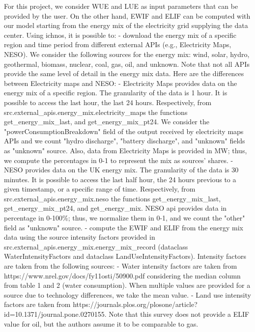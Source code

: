 For this project, we consider WUE and LUE as input parameters that can be provided by the user. On the other hand, EWIF and ELIF can be computed with our model starting from the energy mix of the electricity grid supplying the data center.
Using ichnos, it is possible to:
    - download the energy mix of a specific region and time period from different external APIs (e.g., Electricity Maps, NESO). We consider the following sources for the energy mix: wind, solar, hydro, geothermal, biomass, nuclear, coal, gas, oil, and unknown.
    Note that not all APIs provide the same level of detail in the energy mix data. Here are the differences between Electricity maps and NESO:
        - Electricity Maps provides data on the energy mix of a specific region. The granularity of the data is 1 hour. It is possible to access the last hour, the last 24 hours. Respectively, from src.external_apis.energy_mix.electricity_maps the functions get_energy_mix_last, and get_energy_mix_pt24.
        We consider the "powerConsumptionBreakdown" field of the output received by electricity maps APIs and we count "hydro discharge", "battery discharge", and "unknown" fields as "unknown" source. Also, data from Electricity Maps is provided in MW; thus, we compute the percentages in 0-1 to represent the mix as sources' shares.
        - NESO provides data on the UK energy mix. The granularity of the data is 30 minutes. It is possible to access the last half hour, the 24 hours previous to a given timestamp, or a specific range of time. Respectively, from src.external_apis.energy_mix.neso the functions get_energy_mix_last, get_energy_mix_pt24, and get_energy_mix. NESO api provides data in percentage in 0-100\%; thus, we normalize them in 0-1, and we count the "other" field as "unknown" source.
    - compute the EWIF and ELIF from the energy mix data using the source intensity factors provided in src.external_apis.energy_mix.energy_mix_record (dataclass WaterIntensityFactors and dataclass LandUseIntensityFactors). Intensity factors are taken from the following sources:
        - Water intensity factors are taken from https://www.nrel.gov/docs/fy11osti/50900.pdf considering the median column from table 1 and 2 (water consumption). When multiple values are provided for a source due to technology differences, we take the mean value.
        - Land use intensity factors are taken from https://journals.plos.org/plosone/article?id=10.1371/journal.pone.0270155. Note that this survey does not provide a ELIF value for oil, but the authors assume it to be comparable to gas.

